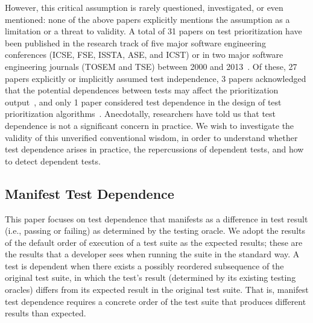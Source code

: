 However, this critical assumption is
rarely questioned, investigated, or even mentioned:
none of the above papers explicitly mentions the assumption
as a limitation or a threat to validity.
A total of 31 papers on test prioritization have been  
published in the research track of five major software engineering conferences
(ICSE, FSE, ISSTA, ASE, and ICST) or in two major software engineering journals
(TOSEM and TSE) between 2000 and 2013~\cite{alltestprior}.
Of these,
27 papers explicitly or implicitly assumed test independence,
3 papers acknowledged that the potential dependences between tests
may affect the prioritization output~\cite{Kim:2002:HTP:581339.581357,
Qu:2008:CRT, Rothermel:2004:TSC},
and only 1 paper considered test dependence in the design of
test prioritization algorithms~\cite{10.1109/TSE.2012.26}.
Anecdotally, researchers have told us that test dependence
is not a significant concern in practice.
We wish to investigate the validity of this unverified conventional wisdom,
in order to understand whether test dependence arises in practice, 
the repercussions of dependent tests, and how to 
detect dependent tests.


\subsection{Manifest Test Dependence}

This paper focuses on test
dependence that manifests as a
difference in test result (i.e., passing or failing) as determined by the testing oracle.
We adopt the results of the default
order of execution of a test suite as the
expected results; these are the results that a developer sees when running
the suite in the standard way. A test is dependent when there exists a possibly
reordered subsequence of the original test suite, in which
the test's result (determined by its existing testing
oracles) differs from its expected result in the
original test suite.
%
That is, manifest test dependence
requires a concrete order of the test suite that
produces {different} results than expected.  
%
%



